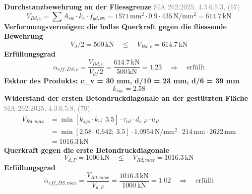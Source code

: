 \documentclass[11pt,a4paper]{article}
\newcommand{\normref}[1]{{\small\textcolor{gray}{#1}}}
\begin{document}
\noindent\textbf{Durchstanzbewehrung an der Fliessgrenze} \hfill \normref{SIA 262:2025, 4.3.6.5.3, (67)}
\begin{equation*}
V_{Rd,v} = \sum A_{sw} \cdot k_e \cdot f_{yd,\text{sw}} = 1571\,\mathrm{mm}^{2} \cdot 0.9 \cdot 435\,\mathrm{N}/\mathrm{mm}^{2} = 614.7\,\mathrm{kN}
\end{equation*}
\noindent\textbf{Verformungsvermögen: die halbe Querkraft gegen die fliessende Bewehrung}
\begin{equation*}
V_d / 2 = 500\,\mathrm{kN} \quad \le \quad V_{Rd,v} = 614.7\,\mathrm{kN}
\end{equation*}
\noindent\textbf{Erfüllungsgrad}
\begin{equation*}
\alpha_{eff,DS,v} = \frac{V_{Rd,v}}{V_d / 2} = \frac{614.7\,\mathrm{kN}}{500\,\mathrm{kN}} = 1.23 \quad \Rightarrow \quad \text{erfüllt}
\end{equation*}
\noindent\textbf{Faktor des Produkts: c\_v = 30 mm, d/10 = 23 mm, d/6 = 39 mm}
\begin{equation*}
k_{sys} = 2.58
\end{equation*}
\noindent\textbf{Widerstand der ersten Betondruckdiagonale an der gestützten Fläche} \hfill \normref{SIA 262:2025, 4.3.6.5.8, (70)}
\begin{equation*}
\begin{aligned}
  V_{Rd,max} &= \min\left[k_{sys} \cdot k_r;\ 3.5\right] \cdot \tau_{cd} \cdot d_{v,P} \cdot u_P \\
  &= \min\left[2.58 \cdot 0.642;\ 3.5\right] \cdot 1.0954\,\mathrm{N}/\mathrm{mm}^{2} \cdot 214\,\mathrm{mm} \cdot 2622\,\mathrm{mm} \\
  &= 1016.3\,\mathrm{kN}
\end{aligned}
\end{equation*}
\noindent\textbf{Querkraft gegen die erste Betondruckdiagonale}
\begin{equation*}
V_{d,P} = 1000\,\mathrm{kN} \quad \le \quad V_{Rd,max} = 1016.3\,\mathrm{kN}
\end{equation*}
\noindent\textbf{Erfüllungsgrad}
\begin{equation*}
\alpha_{eff,DS,max} = \frac{V_{Rd,max}}{V_{d,P}} = \frac{1016.3\,\mathrm{kN}}{1000\,\mathrm{kN}} = 1.02 \quad \Rightarrow \quad \text{erfüllt}
\end{equation*}
\end{document}
